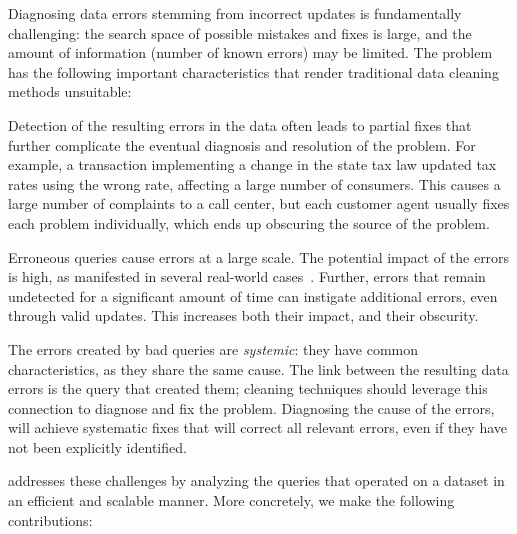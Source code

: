 Diagnosing data errors stemming from incorrect updates is fundamentally
challenging: the search space of possible mistakes and fixes is large, and the
amount of information (number of known errors) may be limited. The problem has
the following important characteristics that render traditional data cleaning
methods unsuitable:



\begin{description}[leftmargin=*, topsep=0mm, itemsep=0mm]
    
    \item[Obscurity.] Detection of the resulting errors in the data often
    leads to partial fixes that further complicate the eventual diagnosis and
    resolution of the problem. For example, a transaction implementing a
    change in the state tax law updated tax rates using the wrong rate,
    affecting a large number of consumers. This causes a large number of
    complaints to a call center, but each customer agent usually fixes each
    problem individually, which ends up obscuring the source of the problem.
    
    \item[Large impact.] Erroneous queries cause errors at a large scale. The
    potential impact of the errors is high, as manifested in several
    real-world cases~\cite{Yates10, Grady13, sakalerrors}. Further, errors
    that remain undetected for a significant amount of time can instigate
    additional errors, even through valid updates. This increases both their
    impact, and their obscurity.
    
    \item[Systemic errors.] The errors created by bad queries are
    \emph{systemic}: they have common characteristics, as they share the same
    cause. The link between the resulting data errors is the query that
    created them; cleaning techniques should leverage this connection to
    diagnose and fix the problem. Diagnosing the cause of the errors, will
    achieve systematic fixes that will correct all relevant errors, even if
    they have not been explicitly identified.
    
\end{description}
% 
\sys addresses these challenges by analyzing the queries that operated on a
dataset in an efficient and scalable manner. More concretely, we make the
following contributions:




